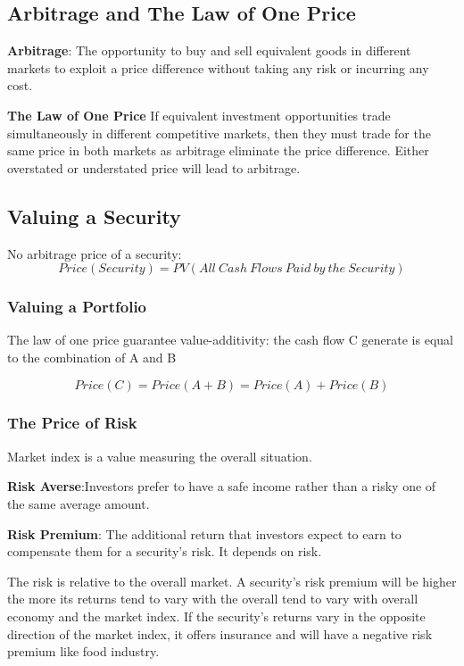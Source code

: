 \documentclass[10pt, a4paper]{article}
\begin{document}
        \subsection{Arbitrage and The Law of One Price}
            \textbf{Arbitrage}: The opportunity to buy and sell equivalent goods in different markets to exploit a price difference without taking any risk or incurring any cost. 

            \textbf{The Law of One Price}
                If equivalent investment opportunities trade simultaneously in different competitive markets, then they must trade for the same price in both markets as arbitrage eliminate the price difference.
                Either overstated or understated price will lead to arbitrage.
                
            \subsection{Valuing a Security}
                No arbitrage price of a security: 
                $$Price(Security) = PV(All\ Cash\ Flows\ Paid\ by\ the\ Security)$$

            \subsubsection{Valuing a Portfolio}
                The law of one price guarantee value-additivity: the cash flow C generate is equal to the combination of A and B

                $$Price(C) = Price(A + B) = Price(A) + Price(B)$$

            \subsubsection{The Price of Risk}
                Market index is a value measuring the overall situation. 

                \textbf{Risk Averse}:Investors prefer  to  have a safe income rather than a risky one of the same average amount. 

                \textbf{Risk Premium}: The additional return that investors expect to earn to compensate them for a security's risk. It depends on risk. 

                The risk is relative to the overall market.  A security's risk premium will be higher the more its returns tend to vary with the overall tend to vary with overall economy and the market index. If the security's returns vary in the opposite direction of the market index, it offers insurance and will have a negative risk premium like food industry.  
\end{document}
